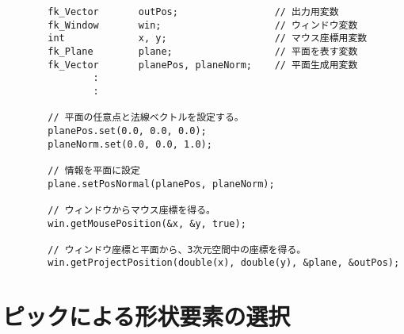 \begin{breakbox}
\begin{verbatim}
        fk_Vector       outPos;                 // 出力用変数
        fk_Window       win;                    // ウィンドウ変数
        int             x, y;                   // マウス座標用変数
        fk_Plane        plane;                  // 平面を表す変数
        fk_Vector       planePos, planeNorm;    // 平面生成用変数
                :
                :

        // 平面の任意点と法線ベクトルを設定する。
        planePos.set(0.0, 0.0, 0.0);
        planeNorm.set(0.0, 0.0, 1.0);

        // 情報を平面に設定
        plane.setPosNormal(planePos, planeNorm);

        // ウィンドウからマウス座標を得る。
        win.getMousePosition(&x, &y, true);

        // ウィンドウ座標と平面から、3次元空間中の座標を得る。
        win.getProjectPosition(double(x), double(y), &plane, &outPos);
\end{verbatim}
\end{breakbox}

\section{ピックによる形状要素の選択}
